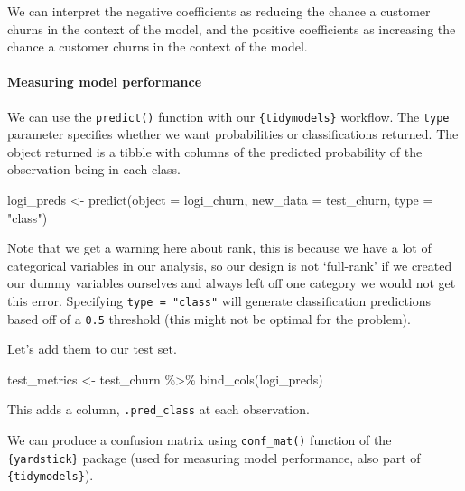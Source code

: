 \documentclass[
]{article}
\newenvironment{Shaded}{\begin{snugshade}}{\end{snugshade}}
\newcommand{\AttributeTok}[1]{\textcolor[rgb]{0.77,0.63,0.00}{#1}}
\newcommand{\FunctionTok}[1]{\textcolor[rgb]{0.00,0.00,0.00}{#1}}
\newcommand{\NormalTok}[1]{#1}
\newcommand{\OtherTok}[1]{\textcolor[rgb]{0.56,0.35,0.01}{#1}}
\newcommand{\SpecialCharTok}[1]{\textcolor[rgb]{0.00,0.00,0.00}{#1}}
\newcommand{\StringTok}[1]{\textcolor[rgb]{0.31,0.60,0.02}{#1}}
\begin{document}
We can interpret the negative coefficients as reducing the chance a
customer churns in the context of the model, and the positive
coefficients as increasing the chance a customer churns in the context
of the model.

\hypertarget{measuring-model-performance}{%
\paragraph{Measuring model
performance}\label{measuring-model-performance}}

We can use the \texttt{predict()} function with our
\texttt{\{tidymodels\}} workflow. The \texttt{type} parameter specifies
whether we want probabilities or classifications returned. The object
returned is a tibble with columns of the predicted probability of the
observation being in each class.

\begin{Shaded}
\begin{Highlighting}[]
\NormalTok{logi\_preds }\OtherTok{\textless{}{-}} \FunctionTok{predict}\NormalTok{(}\AttributeTok{object =}\NormalTok{ logi\_churn, }\AttributeTok{new\_data =}\NormalTok{ test\_churn,}
                      \AttributeTok{type =} \StringTok{"class"}\NormalTok{)}
\end{Highlighting}
\end{Shaded}

Note that we get a warning here about rank, this is because we have a
lot of categorical variables in our analysis, so our design is not
`full-rank' if we created our dummy variables ourselves and always left
off one category we would not get this error. Specifying
\texttt{type\ =\ "class"} will generate classification predictions based
off of a \texttt{0.5} threshold (this might not be optimal for the
problem).

Let's add them to our test set.

\begin{Shaded}
\begin{Highlighting}[]
\NormalTok{test\_metrics }\OtherTok{\textless{}{-}}\NormalTok{ test\_churn }\SpecialCharTok{\%\textgreater{}\%}
  \FunctionTok{bind\_cols}\NormalTok{(logi\_preds)}
\end{Highlighting}
\end{Shaded}

This adds a column, \texttt{.pred\_class} at each observation.

We can produce a confusion matrix using \texttt{conf\_mat()} function of
the \texttt{\{yardstick\}} package (used for measuring model
performance, also part of \texttt{\{tidymodels\}}).
\end{document}
